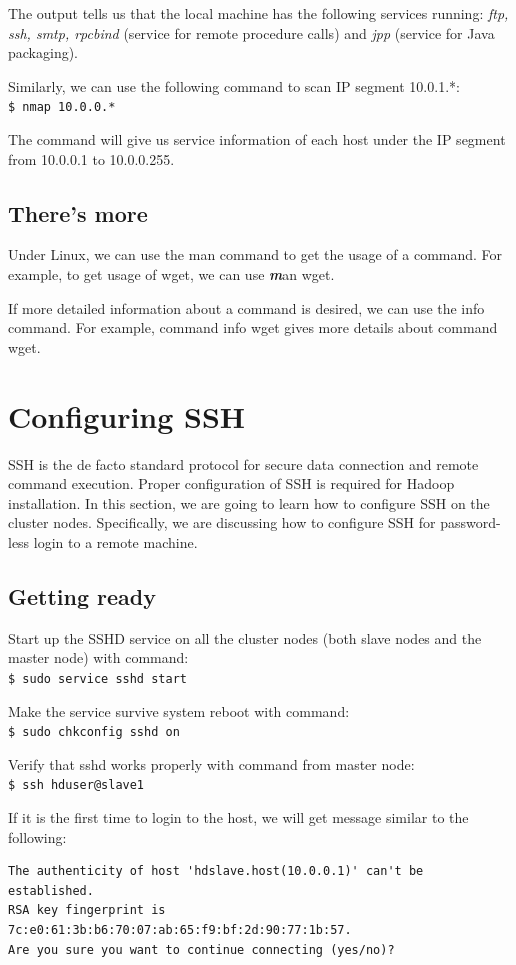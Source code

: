 The output tells us that the local machine has the following services running: \emph{ftp, ssh, smtp, rpcbind} (service for remote procedure calls) and \emph{jpp} (service for Java packaging).

Similarly, we can use the following command to scan IP segment 10.0.1.*: \\
\verb|$ nmap 10.0.0.*|

The command will give us service information of each host under the IP segment from 10.0.0.1 to 10.0.0.255.

\subsection*{There's more}
Under Linux, we can use the man command to get the usage of a command. For example, to get usage of wget, we can use {\emph \textbf man wget}.

If more detailed information about a command is desired, we can use the info command. For example, command info wget gives more details about command wget.

\section{Configuring SSH}
SSH is the de facto standard protocol for secure data connection and remote command execution. Proper configuration of SSH is required for Hadoop installation. In this section, we are going to learn how to configure SSH on the cluster nodes. Specifically, we are discussing how to configure SSH for password-less login to a remote machine.

\subsection*{Getting ready}
Start up the SSHD service on all the cluster nodes (both slave nodes and the master node) with command: \\
\verb|$ sudo service sshd start|

Make the service survive system reboot with command: \\
\verb|$ sudo chkconfig sshd on|

Verify that sshd works properly with command from master node: \\
\verb|$ ssh hduser@slave1|

If it is the first time to login to the host, we will get message similar to the following:
\lstset{style=bashstyle}
\begin{lstlisting}
The authenticity of host 'hdslave.host(10.0.0.1)' can't be established.
RSA key fingerprint is 7c:e0:61:3b:b6:70:07:ab:65:f9:bf:2d:90:77:1b:57.
Are you sure you want to continue connecting (yes/no)?
\end{lstlisting}

